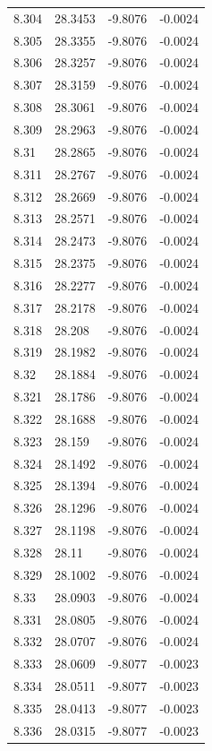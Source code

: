 \begin{tabular}{llll}
8.304 & 28.3453 & -9.8076 & -0.0024 \\
8.305 & 28.3355 & -9.8076 & -0.0024 \\
8.306 & 28.3257 & -9.8076 & -0.0024 \\
8.307 & 28.3159 & -9.8076 & -0.0024 \\
8.308 & 28.3061 & -9.8076 & -0.0024 \\
8.309 & 28.2963 & -9.8076 & -0.0024 \\
8.31 & 28.2865 & -9.8076 & -0.0024 \\
8.311 & 28.2767 & -9.8076 & -0.0024 \\
8.312 & 28.2669 & -9.8076 & -0.0024 \\
8.313 & 28.2571 & -9.8076 & -0.0024 \\
8.314 & 28.2473 & -9.8076 & -0.0024 \\
8.315 & 28.2375 & -9.8076 & -0.0024 \\
8.316 & 28.2277 & -9.8076 & -0.0024 \\
8.317 & 28.2178 & -9.8076 & -0.0024 \\
8.318 & 28.208 & -9.8076 & -0.0024 \\
8.319 & 28.1982 & -9.8076 & -0.0024 \\
8.32 & 28.1884 & -9.8076 & -0.0024 \\
8.321 & 28.1786 & -9.8076 & -0.0024 \\
8.322 & 28.1688 & -9.8076 & -0.0024 \\
8.323 & 28.159 & -9.8076 & -0.0024 \\
8.324 & 28.1492 & -9.8076 & -0.0024 \\
8.325 & 28.1394 & -9.8076 & -0.0024 \\
8.326 & 28.1296 & -9.8076 & -0.0024 \\
8.327 & 28.1198 & -9.8076 & -0.0024 \\
8.328 & 28.11 & -9.8076 & -0.0024 \\
8.329 & 28.1002 & -9.8076 & -0.0024 \\
8.33 & 28.0903 & -9.8076 & -0.0024 \\
8.331 & 28.0805 & -9.8076 & -0.0024 \\
8.332 & 28.0707 & -9.8076 & -0.0024 \\
8.333 & 28.0609 & -9.8077 & -0.0023 \\
8.334 & 28.0511 & -9.8077 & -0.0023 \\
8.335 & 28.0413 & -9.8077 & -0.0023 \\
8.336 & 28.0315 & -9.8077 & -0.0023 \\

\end{tabular}
